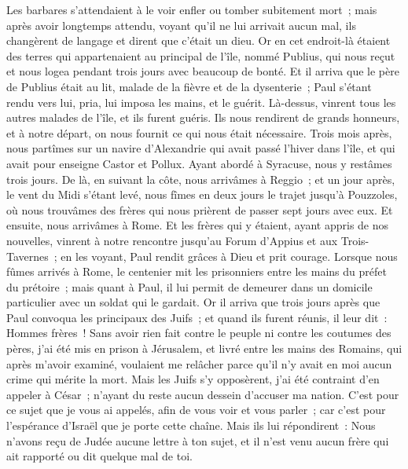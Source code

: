 \begin{multicols}{2}
Les barbares s'attendaient à le voir enfler ou tomber subitement mort~; mais après avoir longtemps attendu, voyant qu'il ne lui arrivait aucun mal, ils changèrent de langage et dirent que c'était un dieu.
Or en cet endroit-là étaient des terres qui appartenaient au principal de l'île, nommé Publius, qui nous reçut et nous logea pendant trois jours avec beaucoup de bonté.
Et il arriva que le père de Publius était au lit, malade de la fièvre et de la dysenterie~; Paul s'étant rendu vers lui, pria, lui imposa les mains, et le guérit.
Là-dessus, vinrent tous les autres malades de l'île, et ils furent guéris.
Ils nous rendirent de grands honneurs, et à notre départ, on nous fournit ce qui nous était nécessaire.
Trois mois après, nous partîmes sur un navire d'Alexandrie qui avait passé l'hiver dans l'île, et qui avait pour enseigne Castor et Pollux.
Ayant abordé à Syracuse, nous y restâmes trois jours.
De là, en suivant la côte, nous arrivâmes à Reggio~; et un jour après, le vent du Midi s'étant levé, nous fîmes en deux jours le trajet jusqu'à Pouzzoles,
où nous trouvâmes des frères qui nous prièrent de passer sept jours avec eux. Et ensuite, nous arrivâmes à Rome.
Et les frères qui y étaient, ayant appris de nos nouvelles, vinrent à notre rencontre jusqu'au Forum d'Appius et aux Trois-Tavernes~; en les voyant, Paul rendit grâces à Dieu et prit courage.
Lorsque nous fûmes arrivés à Rome, le centenier mit les prisonniers entre les mains du préfet du prétoire~; mais quant à Paul, il lui permit de demeurer dans un domicile particulier avec un soldat qui le gardait.
Or il arriva que trois jours après que Paul convoqua les principaux des Juifs~; et quand ils furent réunis, il leur dit~: Hommes frères~! Sans avoir rien fait contre le peuple ni contre les coutumes des pères, j'ai été mis en prison à Jérusalem, et livré entre les mains des Romains,
qui après m'avoir examiné, voulaient me relâcher parce qu'il n'y avait en moi aucun crime qui mérite la mort.
Mais les Juifs s'y opposèrent, j'ai été contraint d'en appeler à César~; n'ayant du reste aucun dessein d'accuser ma nation.
C'est pour ce sujet que je vous ai appelés, afin de vous voir et vous parler~; car c'est pour l'espérance d'Israël que je porte cette chaîne.
Mais ils lui répondirent~: Nous n'avons reçu de Judée aucune lettre à ton sujet, et il n'est venu aucun frère qui ait rapporté ou dit quelque mal de toi.

\end{multicols}

